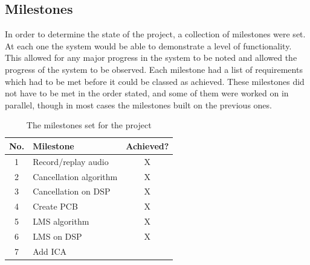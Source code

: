 \subsection{Milestones}
In order to determine the state of the project, a collection of milestones were set.
At each one the system would be able to demonstrate a level of functionality.
This allowed for any major progress in the system to be noted and allowed the progress of the system to be observed.
Each milestone had a list of requirements which had to be met before it could be classed as achieved.
These milestones did not have to be met in the order stated, and some of them were worked on in parallel, though in most cases the milestones built on the previous ones.

\begin{table}[H]
	\centering
	\begin{tabular}[c]{| c | l | c |}
		\hline
		No.	& Milestone		& Achieved? \\
		\hline
		1	& Record/replay audio	& X \\
		2	& Cancellation algorithm & X \\
		3	& Cancellation on DSP	& X \\
		4	& Create PCB		& X \\
		5	& LMS algorithm		& X \\
		6	& LMS on DSP		& X \\
		7	& Add ICA		& \\
		\hline
	\end{tabular}
	\caption{The milestones set for the project}
	\label{tab:milestones}
\end{table}
